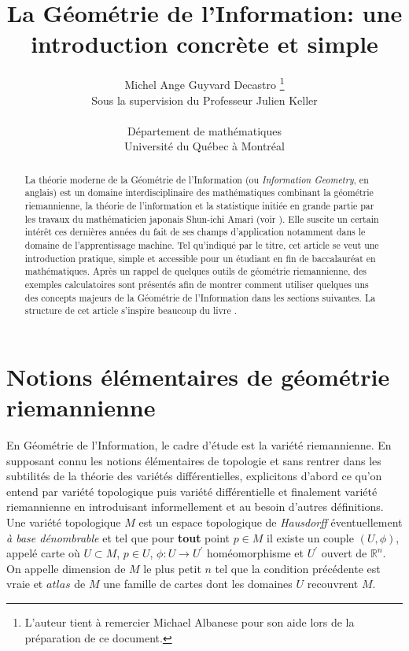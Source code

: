 \documentclass[11pt,french]{article}
\title{\textbf{\color{blue}La Géométrie de l'Information: une introduction concrète et simple}}
\author{Michel Ange Guyvard Decastro
	\thanks{L'auteur tient à remercier Michael Albanese pour son aide lors de la préparation de ce document.}\\
  Sous la supervision du Professeur Julien Keller\\\\
  Département de mathématiques\\
Université du Québec à Montréal	}
\begin{document}
	\maketitle

\renewcommand{\abstractname}{Résumé}
	
\begin{abstract}
La théorie moderne de la Géométrie de l'Information (ou \textit{Information Geometry}, en anglais) est un domaine interdisciplinaire des mathématiques combinant la géométrie riemannienne, la théorie de l'information et la statistique initiée en grande partie par les travaux du mathématicien japonais Shun-ichi Amari (voir \cite{amari1985differential}). Elle suscite un certain intérêt ces dernières années du fait de ses champs d'application notamment dans le domaine de l'apprentissage machine. Tel qu'indiqué par le titre, cet article se veut une introduction pratique, simple et accessible pour un étudiant en fin de baccalauréat en mathématiques. Après un rappel de quelques outils de géométrie riemannienne, des exemples calculatoires sont présentés afin de montrer comment utiliser quelques uns des concepts majeurs de la Géométrie de l'Information dans les sections suivantes. La structure de cet article s'inspire beaucoup du livre \cite{calin2014geometric}.
	 	
\end{abstract}
\nocite{*}
\section{Notions élémentaires de géométrie riemannienne}
En Géométrie de l'Information, le cadre d'étude est la variété riemannienne. En supposant connu les notions élémentaires de topologie et sans rentrer dans les subtilités de la théorie des variétés différentielles, explicitons d'abord ce qu'on entend par variété topologique puis variété différentielle et finalement variété riemannienne en introduisant informellement et au besoin d'autres définitions.\\

Une variété topologique $M$ est un espace topologique de \textit{Hausdorff} éventuellement \textit{à base dénombrable} et tel que pour \textbf{tout} point $p\in M$ il existe un couple $(U, \phi)$, appelé carte où $U\subset M$, $p \in U$, $\phi:U \longrightarrow U^{'}$ homéomorphisme et $U^{'}$ ouvert de $\mathbb{R}^{n}$.  
On appelle dimension de $M$ le plus petit $n$ tel que la condition précédente est vraie et $atlas$ de $M$ une famille de cartes dont les domaines $U$ recouvrent $M$.
\end{document}
